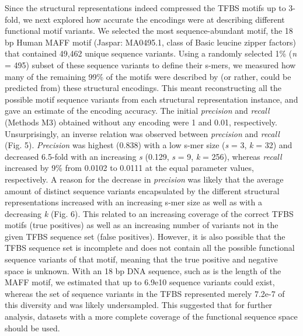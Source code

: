 \documentclass[sigconf]{acmart}
\begin{document}
Since the structural representations indeed compressed the TFBS motifs up to 3-fold, we next explored how accurate the encodings were at describing different functional motif variants. We selected the most sequence-abundant motif, the 18 bp Human MAFF motif (Jaspar: MA0495.1, class of Basic leucine zipper factors) that contained 49,462 unique sequence variants. Using a randomly selected 1\% (\textit{n} = 495) subset of these sequence variants to define their s-mers, we measured how many of the remaining 99\% of the motifs were described by (or rather, could be predicted from) these structural encodings. This meant reconstructing all the possible motif sequence variants from each structural representation instance, and gave an estimate of the encoding accuracy. The initial \textit{precision} and \textit{recall} (Methods M3) obtained without any encoding were 1 and 0.01, respectively. Unsurprisingly, an inverse relation was observed between \textit{precision} and \textit{recall} (Fig. 5). \textit{Precision} was highest (0.838) with a low s-mer size (\textit{s} = 3, \textit{k} = 32) and decreased 6.5-fold with an increasing \textit{s} (0.129, \textit{s} = 9, \textit{k} = 256), whereas \textit{recall} increased by 9\% from 0.0102 to 0.0111 at the equal parameter values, respectively. A reason for the decrease in \textit{precision} was likely that the average amount of distinct sequence variants encapsulated by the different structural representations increased with an increasing s-mer size as well as with a decreasing \textit{k} (Fig. 6). This related to an increasing coverage of the correct TFBS motifs (true positives) as well as an increasing number of variants not in the given TFBS sequence set (false positives). However, it is also possible that the TFBS sequence set is incomplete and does not contain all the possible functional sequence variants of that motif, meaning that the true positive and negative space is unknown. With an 18 bp DNA sequence, such as is the length of the MAFF motif, we estimated that up to 6.9e10 sequence variants could exist, whereas the set of sequence variants in the TFBS represented merely 7.2e-7 of this diversity and was likely undersampled. This suggested that for further analysis, datasets with a more complete coverage of the functional sequence space should be used.
\end{document}
